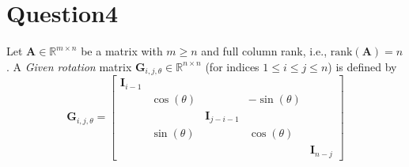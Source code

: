 \documentclass{article}
\newcommand{\R}{\mathbb{R}}
\begin{document}
\section*{Question4}
Let \(\bm{A} \in \R^{m \times n}\) be a matrix with \(m \geq n\) and full column rank, i.e., \(\text{rank}(\bm{A}) = n\). A \textit{Given rotation} matrix \(\bm{G}_{i, j, \theta} \in \R^{n \times n}\) (for indices \(1 \leq i \leq j \leq n\)) is defined by
\[
    \bm{G}_{i, j, \theta} = \begin{bmatrix}
        \bm{I}_{i-1} &  &  &  &  \\
                     & \cos(\theta) &  & -\sin(\theta) & \\
                     & & \bm{I}_{j - i - 1}& & \\
         & \sin(\theta) && \cos(\theta) &\\
         & &&& \bm{I}_{n-j}
    \end{bmatrix}
\]
\end{document}
